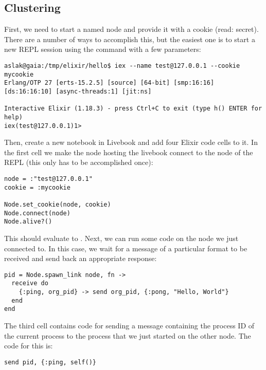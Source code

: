 \subsection{Clustering}


First, we need to start a named node and provide it with a cookie (read: secret). There are a number of ways to accomplish this, but the easiest one is to start a new REPL session using the  command with a few parameters:

\begin{verbatim}
aslak@gaia:/tmp/elixir/hello$ iex --name test@127.0.0.1 --cookie mycookie 
Erlang/OTP 27 [erts-15.2.5] [source] [64-bit] [smp:16:16] [ds:16:16:10] [async-threads:1] [jit:ns]

Interactive Elixir (1.18.3) - press Ctrl+C to exit (type h() ENTER for help)
iex(test@127.0.0.1)1>
\end{verbatim}

Then, create a new notebook in Livebook and add four Elixir code cells to it. In the first cell we make the node hosting the livebook connect to the node of the REPL (this only has to be accomplished once):

\begin{verbatim}
node = :"test@127.0.0.1"
cookie = :mycookie

Node.set_cookie(node, cookie)
Node.connect(node)
Node.alive?()
\end{verbatim}

This should evaluate to . Next, we can run some code on the node we just connected to. In this case, we wait for a message of a particular format to be received and send back an appropriate response:

\begin{verbatim}
pid = Node.spawn_link node, fn ->
  receive do
    {:ping, org_pid} -> send org_pid, {:pong, "Hello, World"}
  end
end
\end{verbatim}

The third cell contains code for sending a message containing the process ID of the current process to the process that we just started on the other node. The code for this is:

\begin{verbatim}
send pid, {:ping, self()}
\end{verbatim}

